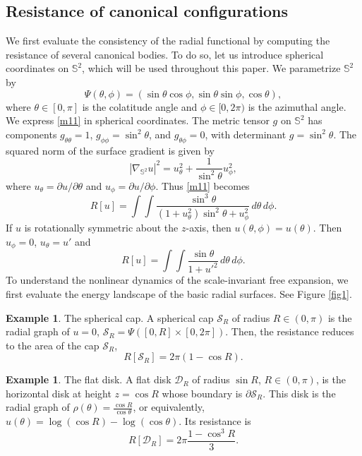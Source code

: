 \documentclass[a4paper,12pt]{amsart}
\theoremstyle{plain}
\theoremstyle{definition}
\newtheorem{example}[theorem]{Example}
\def\s{\mathbb S}
\def\S{\mathcal S}
\begin{document}
\subsection{Resistance of  canonical  configurations}

We first evaluate the consistency of the radial functional by computing the resistance of several canonical bodies. To do so, let us introduce spherical coordinates on $\s^2$, which will be used throughout this paper. We parametrize $\s^2$ by 
$$\Psi(\theta,\phi)=(\sin\theta\cos\phi,\sin\theta\sin\phi,\cos\theta),$$
 where $\theta \in [0, \pi]$ is the colatitude angle and $\phi \in [0, 2\pi)$ is the azimuthal angle. We express \eqref{m11} in spherical coordinates. The metric tensor $g$ on $\s^2$ has components $g_{\theta\theta} = 1$, $g_{\phi\phi} = \sin^2\theta$, and $g_{\theta\phi} = 0$, with determinant $g = \sin^2\theta$. The squared norm of the surface gradient is given by
\begin{equation}\label{uu}
 |\nabla_{\mathbb{S}^2} u|^2 = u_\theta^2 + \frac{1}{\sin^2\theta} u_\phi^2,
\end{equation}
where $u_\theta = \partial u/\partial \theta$ and $u_\phi = \partial u/\partial \phi$. Thus \eqref{m11} becomes
\begin{equation}\label{r7}
R[u]=\int\int \frac{\sin^3\theta}{(1+u_\theta^2)\sin^2\theta+u_\phi^2}\, d\theta\, d\phi.
\end{equation}
If $u$ is rotationally symmetric about the $z$-axis, then $u(\theta,\phi)=u(\theta)$. Then $u_\phi=0$, $u_\theta=u'$ and 
$$R[u]=\int\int \frac{\sin\theta}{1+u'^2}\, d\theta\, d\phi.$$
To understand the nonlinear dynamics of the scale-invariant free expansion, we first evaluate the energy landscape of the basic radial surfaces. See Figure \ref{fig1}.

\begin{example} The spherical cap. A spherical cap $\S_R$ of radius $R\in (0,\pi)$ is the radial graph of $u=0$, $\S_R=\Psi( [0,R]\times[0,2\pi])$. Then, the resistance reduces to the area of the cap $\S_R$, 
\begin{equation}\label{rrr}
R[\S_R]=2\pi(1-\cos R).
\end{equation}
\end{example}

\begin{example} The flat disk. A flat disk $\mathcal{D}_R$ of radius $\sin R$, $R\in (0,\pi)$, is the horizontal disk at height $z=\cos R$ whose boundary is $\partial\S_R$. This disk is the radial graph of $\rho(\theta)=\frac{\cos R}{\cos\theta}$, or equivalently, $u(\theta)=\log(\cos R)-\log (\cos\theta)$. Its resistance is 
$$R[\mathcal{D}_R]=2\pi\frac{1-\cos^3 R}{3}.$$
\end{example}
\end{document}
